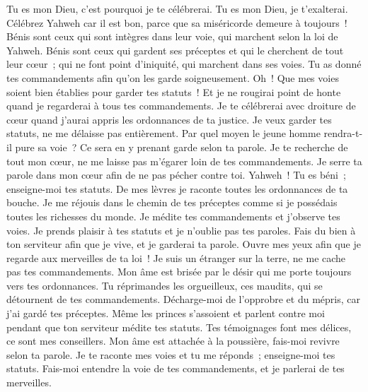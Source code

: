 \begin{multicols}{2}
Tu es mon Dieu, c'est pourquoi je te célébrerai. Tu es mon Dieu, je t'exalterai.
Célébrez Yahweh car il est bon, parce que sa miséricorde demeure à toujours~!
\VerseOne{} Bénis sont ceux qui sont intègres dans leur voie, qui marchent selon la loi de Yahweh.
Bénis sont ceux qui gardent ses préceptes et qui le cherchent de tout leur cœur~;
qui ne font point d'iniquité, qui marchent dans ses voies.
Tu as donné tes commandements afin qu'on les garde soigneusement.
Oh~! Que mes voies soient bien établies pour garder tes statuts~!
Et je ne rougirai point de honte quand je regarderai à tous tes commandements.
Je te célébrerai avec droiture de cœur quand j'aurai appris les ordonnances de ta justice.
Je veux garder tes statuts, ne me délaisse pas entièrement.
 Par quel moyen le jeune homme rendra-t-il pure sa voie~? Ce sera en y prenant garde selon ta parole.
Je te recherche de tout mon cœur, ne me laisse pas m'égarer loin de tes commandements.
Je serre ta parole dans mon cœur afin de ne pas pécher contre toi.
Yahweh~! Tu es béni~; enseigne-moi tes statuts.
De mes lèvres je raconte toutes les ordonnances de ta bouche.
Je me réjouis dans le chemin de tes préceptes comme si je possédais toutes les richesses du monde.
Je médite tes commandements et j'observe tes voies.
Je prends plaisir à tes statuts et je n'oublie pas tes paroles.
 Fais du bien à ton serviteur afin que je vive, et je garderai ta parole.
Ouvre mes yeux afin que je regarde aux merveilles de ta loi~!
Je suis un étranger sur la terre, ne me cache pas tes commandements.
Mon âme est brisée par le désir qui me porte toujours vers tes ordonnances.
Tu réprimandes les orgueilleux, ces maudits, qui se détournent de tes commandements.
Décharge-moi de l'opprobre et du mépris, car j'ai gardé tes préceptes.
Même les princes s'assoient et parlent contre moi pendant que ton serviteur médite tes statuts.
Tes témoignages font mes délices, ce sont mes conseillers.
 Mon âme est attachée à la poussière, fais-moi revivre selon ta parole.
Je te raconte mes voies et tu me réponds~; enseigne-moi tes statuts.
Fais-moi entendre la voie de tes commandements, et je parlerai de tes merveilles.

\end{multicols}
